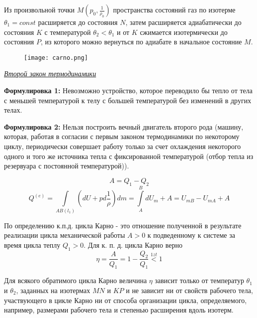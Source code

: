 Из произвольной точки $M (p_0, \frac{1}{\rho_0})$ пространства состояний газ по изотерме $\theta_1 = const$ расширяется до состояния $N$, затем расширяется адиабатически до состояния $K$ с температурой $\theta_2 < \theta_1$ и от $K$ сжимается изотермически до состояния $P$, из которого можно вернуться по адиабате в начальное состояние $M$.

\begin{figure}[H]
\texttt{[image: carno.png]}
\end{figure}


\begin{center}
	\textit{\underline{Второй закон термодинамики}}
\end{center}

\textbf{Формулировка 1:} Невозможно устройство, которое переводило бы тепло от тела с меньшей температурой к телу с большей температурой без изменений в других телах.

\textbf{Формулировка 2:} Нельзя построить вечный двигатель второго рода (машину,  которая,  работая в согласии с первым законом термодинамики по некоторому циклу,  периодически совершает работу только за счет охлаждения некоторого одного и того же источника тепла с фиксированной температурой (отбор тепла из резервуара с постоянной температурой)).

$$ A = Q_1 - Q_2 $$
$$ Q^{(e)} = \int\limits_{AB(l_1)}\left( dU + pd\frac{1}{\rho} \right) dm = \int\limits_{A}^{B}dU_m + A = U_{mB} - U_{mA} + A $$

По определению к.п.д.  цикла Карно - это отношение полученной в результате реализации цикла механической работы $A > 0$ к подведенному к системе за время цикла теплу $Q_1 > 0$.  Для к. п. д. цикла Карно верно
$$ \eta = \frac{A}{Q_1} = 1 - \frac{Q_2}{Q_1} \overset{1zt}{<} 1 $$

\begin{state}
	Для всякого обратимого цикла Карно величина $\eta$ зависит только от температур $\theta_1$ и $\theta_2$,  заданных на изотермах $MN$ и $KP$ и не зависит ни от свойств рабочего тела, участвующего в цикле Карно ни от способа организации цикла, определяемого, например, размерами рабочего тела и степенью расширения вдоль изотерм.
\end{state}

